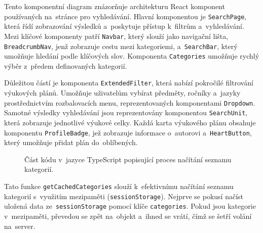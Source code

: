 \documentclass[male,czech,api_bc]{kitheses}
\begin{document}
Tento komponentní diagram znázorňuje architekturu React komponent používaných na~stránce pro vyhledávání. Hlavní komponentou je \texttt{SearchPage}, která řídí zobrazování výsledků a~poskytuje přístup k~filtrům a~vyhledávání. Mezi klíčové komponenty patří \texttt{Navbar}, který slouží jako navigační lišta, \texttt{BreadcrumbNav}, jenž zobrazuje cestu mezi kategoriemi, a~\texttt{SearchBar}, který umožňuje hledání podle klíčových slov. Komponenta \texttt{Categories} umožňuje rychlý výběr z~předem definovaných kategorií.

Důležitou částí je komponenta \texttt{ExtendedFilter}, která nabízí pokročilé filtrování výukových plánů. Umožňuje uživatelům vybírat předměty, ročníky a~jazyky prostřednictvím rozbalovacích menu, reprezentovaných komponentami \texttt{Dropdown}. Samotné výsledky vyhledávání jsou reprezentovány komponentou \texttt{SearchUnit}, která zobrazuje jednotlivé výukové celky. Každá karta výukového plánu obsahuje komponentu \texttt{ProfileBadge}, jež zobrazuje informace o~autorovi a~\texttt{HeartButton}, který umožňuje přidat plán do~oblíbených.

\begin{figure}[H]
	\centering
	\caption{Část kódu v~jazyce TypeScript popisující proces načítání seznamu kategorií.}
	\label{fig:code-6}
\end{figure}

Tato funkce \texttt{getCachedCategories} slouží k~efektivnímu načítání seznamu kategorií s~využitím mezipaměti (\texttt{sessionStorage}). Nejprve se pokusí načíst uložená data ze~\texttt{sessionStorage} pomocí klíče \texttt{categories}. Pokud jsou kategorie v~mezipaměti, převedou se zpět na~objekt a~ihned se vrátí, čímž se šetří volání na~server.
\end{document}
